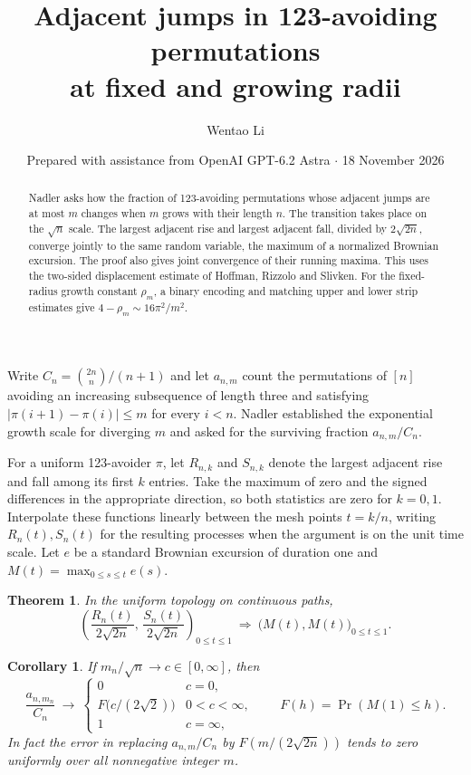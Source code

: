 \documentclass[11pt]{article}
\title{Adjacent jumps in 123-avoiding permutations\\at fixed and growing radii}
\author{Wentao Li}
\date{Prepared with assistance from OpenAI GPT-6.2 Astra $\cdot$ 18 November 2026}
\newtheorem{theorem}{Theorem}
\newtheorem*{corollary}{Corollary}
\begin{document}
\maketitle
\begin{abstract}
Nadler asks how the fraction of 123-avoiding permutations whose adjacent jumps are at most $m$ changes when $m$ grows with their length $n$. The transition takes place on the $\sqrt n$ scale. The largest adjacent rise and largest adjacent fall, divided by $2\sqrt{2n}$, converge jointly to the same random variable, the maximum of a normalized Brownian excursion. The proof also gives joint convergence of their running maxima. This uses the two-sided displacement estimate of Hoffman, Rizzolo and Slivken. For the fixed-radius growth constant $\rho_m$, a binary encoding and matching upper and lower strip estimates give $4-\rho_m\sim16\pi^2/m^2$.
\end{abstract}

Write $C_n=\binom{2n}{n}/(n+1)$ and let $a_{n,m}$ count the permutations of $[n]$ avoiding an increasing subsequence of length three and satisfying $|\pi(i+1)-\pi(i)|\le m$ for every $i<n$. Nadler \cite[\S9.4]{nadler} established the exponential growth scale for diverging $m$ and asked for the surviving fraction $a_{n,m}/C_n$.

For a uniform 123-avoider $\pi$, let $R_{n,k}$ and $S_{n,k}$ denote the largest adjacent rise and fall among its first $k$ entries. Take the maximum of zero and the signed differences in the appropriate direction, so both statistics are zero for $k=0,1$. Interpolate these functions linearly between the mesh points $t=k/n$, writing $R_n(t), S_n(t)$ for the resulting processes when the argument is on the unit time scale. Let $e$ be a standard Brownian excursion of duration one and $M(t)=\max_{0\le s\le t}e(s)$.

\begin{theorem}
In the uniform topology on continuous paths,
\[
 \left(\frac{R_n(t)}{2\sqrt{2n}},\,\frac{S_n(t)}{2\sqrt{2n}}\right)_{0\le t\le1}
 \ \Longrightarrow\ \big(M(t),M(t)\big)_{0\le t\le1}.
\]
\end{theorem}

\begin{corollary}
If $m_n/\sqrt n\to c\in[0,\infty]$, then
\[
 \frac{a_{n,m_n}}{C_n}\ \longrightarrow\
 \begin{cases}
 0 & c=0,\\
 F\big(c/(2\sqrt 2)\big) & 0<c<\infty,\\
 1 & c=\infty,
 \end{cases}
 \qquad F(h)=\Pr(M(1)\le h).
\]
In fact the error in replacing $a_{n,m}/C_n$ by $F(m/(2\sqrt{2n}))$ tends to zero uniformly over all nonnegative integer $m$.
\end{corollary}
\end{document}
